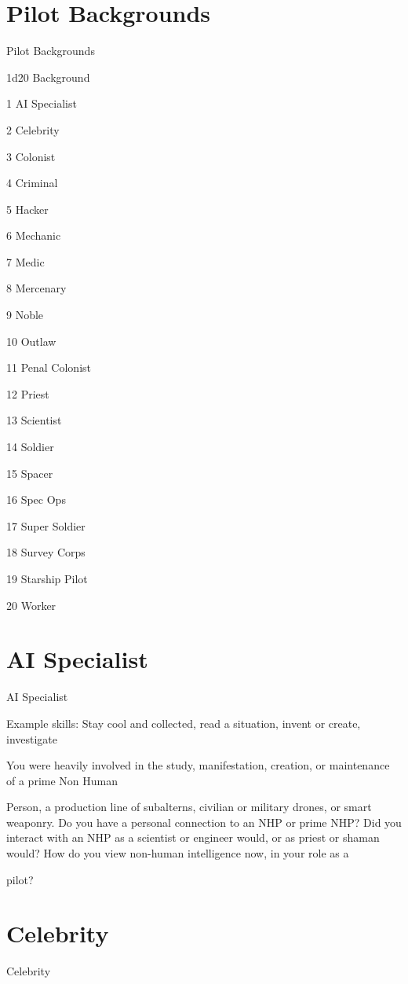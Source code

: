 \section{Pilot Backgrounds}


                                Pilot Backgrounds

 1d20       Background

  1        AI Specialist

  2         Celebrity

  3         Colonist

  4         Criminal

  5         Hacker

  6         Mechanic

  7         Medic

  8         Mercenary

  9         Noble

  10       Outlaw

  11        Penal Colonist

  12        Priest

  13       Scientist

  14       Soldier

  15       Spacer

  16       Spec Ops

  17       Super Soldier

  18       Survey Corps

  19       Starship Pilot

  20       Worker
\section{AI Specialist}
                                               AI Specialist

Example skills: Stay cool and collected, read a situation, invent or create, investigate

You were heavily involved in the study, manifestation, creation, or maintenance of a prime Non Human

Person, a production line of subalterns, civilian or military drones, or smart weaponry. Do you have a
personal connection to an NHP or prime NHP? Did you interact with an NHP as a scientist or engineer
would, or as priest or shaman would? How do you view non-human intelligence now, in your role as a

pilot?




\section{Celebrity}
                                                    Celebrity

